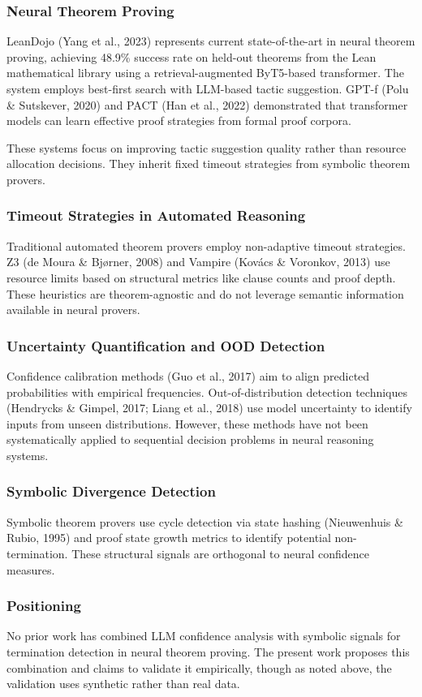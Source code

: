 
\subsubsection{Neural Theorem Proving}

LeanDojo (Yang et al., 2023) represents current state-of-the-art in neural theorem proving, achieving 48.9\% success rate on held-out theorems from the Lean mathematical library using a retrieval-augmented ByT5-based transformer. The system employs best-first search with LLM-based tactic suggestion. GPT-f (Polu \& Sutskever, 2020) and PACT (Han et al., 2022) demonstrated that transformer models can learn effective proof strategies from formal proof corpora.

These systems focus on improving tactic suggestion quality rather than resource allocation decisions. They inherit fixed timeout strategies from symbolic theorem provers.

\subsubsection{Timeout Strategies in Automated Reasoning}

Traditional automated theorem provers employ non-adaptive timeout strategies. Z3 (de Moura \& Bjørner, 2008) and Vampire (Kovács \& Voronkov, 2013) use resource limits based on structural metrics like clause counts and proof depth. These heuristics are theorem-agnostic and do not leverage semantic information available in neural provers.

\subsubsection{Uncertainty Quantification and OOD Detection}

Confidence calibration methods (Guo et al., 2017) aim to align predicted probabilities with empirical frequencies. Out-of-distribution detection techniques (Hendrycks \& Gimpel, 2017; Liang et al., 2018) use model uncertainty to identify inputs from unseen distributions. However, these methods have not been systematically applied to sequential decision problems in neural reasoning systems.

\subsubsection{Symbolic Divergence Detection}

Symbolic theorem provers use cycle detection via state hashing (Nieuwenhuis \& Rubio, 1995) and proof state growth metrics to identify potential non-termination. These structural signals are orthogonal to neural confidence measures.

\subsubsection{Positioning}

No prior work has combined LLM confidence analysis with symbolic signals for termination detection in neural theorem proving. The present work proposes this combination and claims to validate it empirically, though as noted above, the validation uses synthetic rather than real data.
